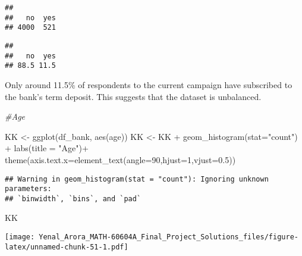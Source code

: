 \documentclass[
]{article}
\newenvironment{Shaded}{\begin{snugshade}}{\end{snugshade}}
\newcommand{\AttributeTok}[1]{\textcolor[rgb]{0.77,0.63,0.00}{#1}}
\newcommand{\CommentTok}[1]{\textcolor[rgb]{0.56,0.35,0.01}{\textit{#1}}}
\newcommand{\DecValTok}[1]{\textcolor[rgb]{0.00,0.00,0.81}{#1}}
\newcommand{\FloatTok}[1]{\textcolor[rgb]{0.00,0.00,0.81}{#1}}
\newcommand{\FunctionTok}[1]{\textcolor[rgb]{0.00,0.00,0.00}{#1}}
\newcommand{\NormalTok}[1]{#1}
\newcommand{\OtherTok}[1]{\textcolor[rgb]{0.56,0.35,0.01}{#1}}
\newcommand{\SpecialCharTok}[1]{\textcolor[rgb]{0.00,0.00,0.00}{#1}}
\newcommand{\StringTok}[1]{\textcolor[rgb]{0.31,0.60,0.02}{#1}}
\begin{document}
\begin{verbatim}
## 
##   no  yes 
## 4000  521
\end{verbatim}

\begin{Shaded}
\end{Shaded}

\begin{verbatim}
## 
##   no  yes 
## 88.5 11.5
\end{verbatim}

Only around 11.5\% of respondents to the current campaign have
subscribed to the bank's term deposit. This suggests that the dataset is
unbalanced.

\begin{Shaded}
\begin{Highlighting}[]
\CommentTok{\#Age}

\NormalTok{KK }\OtherTok{\textless{}{-}} \FunctionTok{ggplot}\NormalTok{(df\_bank, }\FunctionTok{aes}\NormalTok{(age))}
\NormalTok{KK }\OtherTok{\textless{}{-}}\NormalTok{ KK }\SpecialCharTok{+} \FunctionTok{geom\_histogram}\NormalTok{(}\AttributeTok{stat=}\StringTok{"count"}\NormalTok{) }\SpecialCharTok{+} \FunctionTok{labs}\NormalTok{(}\AttributeTok{title =} \StringTok{"Age"}\NormalTok{)}\SpecialCharTok{+}
  \FunctionTok{theme}\NormalTok{(}\AttributeTok{axis.text.x=}\FunctionTok{element\_text}\NormalTok{(}\AttributeTok{angle=}\DecValTok{90}\NormalTok{,}\AttributeTok{hjust=}\DecValTok{1}\NormalTok{,}\AttributeTok{vjust=}\FloatTok{0.5}\NormalTok{))}
\end{Highlighting}
\end{Shaded}

\begin{verbatim}
## Warning in geom_histogram(stat = "count"): Ignoring unknown parameters:
## `binwidth`, `bins`, and `pad`
\end{verbatim}

\begin{Shaded}
\begin{Highlighting}[]
\NormalTok{KK}
\end{Highlighting}
\end{Shaded}

\texttt{[image: Yenal\_Arora\_MATH-60604A\_Final\_Project\_Solutions\_files/figure-latex/unnamed-chunk-51-1.pdf]}
\end{document}
